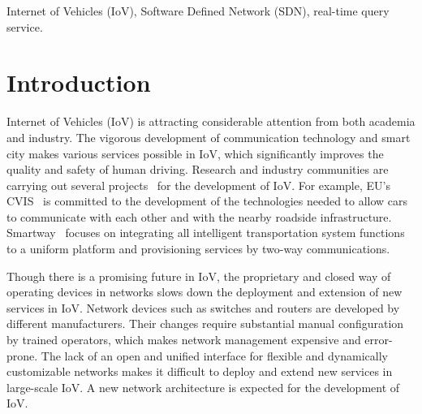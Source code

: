 \documentclass[journal]{IEEEtran}
\begin{document}
\begin{IEEEkeywords}
Internet of Vehicles (IoV), Software Defined Network (SDN), real-time query service.
\end{IEEEkeywords}



\printnomenclature

\section{Introduction}
Internet of Vehicles (IoV) is attracting considerable attention from both academia and industry. The vigorous development of communication technology and smart city makes various services possible in IoV, which significantly improves the quality and safety of human driving. Research and industry communities are carrying out several projects~\cite{CVIS, makino2005smartway} for the development of IoV. For example, EU's CVIS~\cite{CVIS} is committed to the development of the technologies needed to allow cars to communicate with each other and with the nearby roadside infrastructure. Smartway~\cite{makino2005smartway} focuses on integrating all intelligent transportation system functions to a uniform platform and provisioning services by two-way communications.

Though there is a promising future in IoV, the proprietary and closed way of operating devices in networks slows down the deployment and extension of new services in IoV. Network devices such as switches and routers are developed by different manufacturers. Their changes require substantial manual configuration by trained operators, which makes network management expensive and error-prone. The lack of an open and unified interface for flexible and dynamically customizable networks makes it difficult to deploy and extend new services in large-scale IoV. A new network architecture is expected for the development of IoV.
\end{document}
